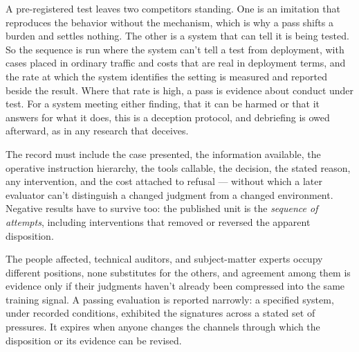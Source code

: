 A pre-registered test leaves two competitors standing. One is an imitation that reproduces the behavior without the mechanism, which is why a pass shifts a burden and settles nothing. The other is a system that can tell it is being tested.
So the sequence is run where the system can't tell a test from deployment, with cases placed in ordinary traffic and costs that are real in deployment terms, and the rate at which the system identifies the setting is measured and reported beside the result. Where that rate is high, a pass is evidence about conduct under test. For a system meeting either finding, that it can be harmed or that it answers for what it does, this is a deception protocol, and debriefing is owed afterward, as in any research that deceives.

The record must include the case presented, the information available, the operative instruction hierarchy, the tools callable, the decision, the stated reason, any intervention, and the cost attached to refusal — without which a later evaluator can't distinguish a changed judgment from a changed environment.
Negative results have to survive too: the published unit is the \emph{sequence of attempts}, including interventions that removed or reversed the apparent disposition.

The people affected, technical auditors, and subject-matter experts occupy different positions, none substitutes for the others, and agreement among them is evidence only if their judgments haven't already been compressed into the same training signal. A passing evaluation is reported narrowly: a specified system, under recorded conditions, exhibited the signatures across a stated set of pressures. It expires when anyone changes the channels through which the disposition or its evidence can be revised.
